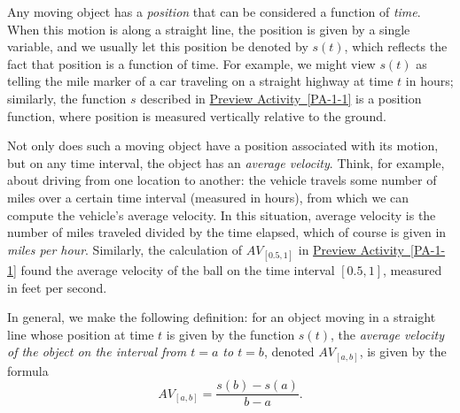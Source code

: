 \documentclass[10pt,]{book}
\theoremstyle{plain}
\theoremstyle{definition}
\theoremstyle{definition}
\theoremstyle{definition}
\theoremstyle{definition}
\theoremstyle{definition}
\numberwithin{equation}{section}
\begin{document}
Any moving object has a \emph{position}\index{} that can be considered a function of \emph{time}. When this motion is along a straight line, the position is given by a single variable, and we usually let this position be denoted by \(s(t)\), which reflects the fact that position is a function of time. For example, we might view \(s(t)\) as telling the mile marker of a car traveling on a straight highway at time \(t\) in hours; similarly, the function \(s\) described in \hyperref[PA-1-1]{Preview Activity~\ref{PA-1-1}} is a position function, where position is measured vertically relative to the ground.
%
\par

Not only does such a moving object have a position associated with its motion, but on any time interval, the object has an \emph{average velocity}. Think, for example, about driving from one location to another: the vehicle travels some number of miles over a certain time interval (measured in hours), from which we can compute the vehicle's average velocity. In this situation, average velocity is the number of miles traveled divided by the time elapsed, which of course is given in \emph{miles per hour}. Similarly, the calculation of \(AV_{[0.5,1]}\) in \hyperref[PA-1-1]{Preview Activity~\ref{PA-1-1}} found the average velocity of the ball on the time interval \([0.5,1]\), measured in feet per second.
%
\par

In general, we make the following definition: for an object moving in a straight line whose position at time \(t\) is given by the function \(s(t)\), the \emph{average velocity\index{} of the object on the interval from \(t = a\) to \(t = b\)}, denoted \(AV_{[a,b]}\), is given by the formula
%
\begin{equation*}
AV_{[a,b]} = \frac{s(b)-s(a)}{b-a}.
\end{equation*}\par
\end{document}
